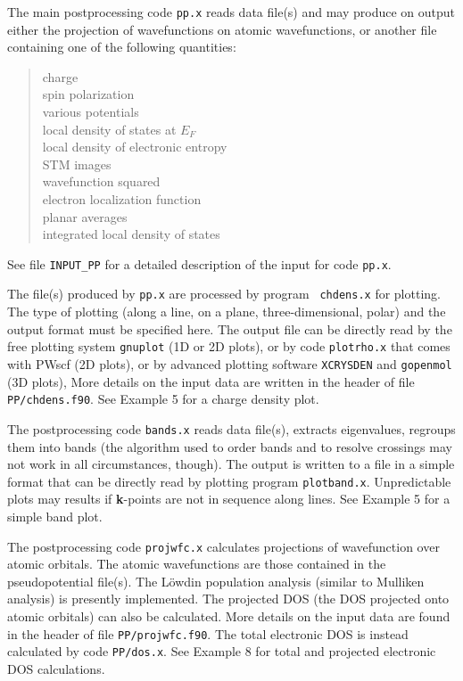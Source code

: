 \documentclass[12pt]{article}
\begin{document}
The main postprocessing code {\tt pp.x} reads data file(s) and may
produce on output either the projection of wavefunctions on atomic
wavefunctions, or another file containing one of the following
quantities:
\begin{quote}
charge\\
spin polarization\\
various potentials\\
local density of states at $E_F$\\
local density of electronic entropy\\
STM images\\
wavefunction squared\\
electron localization function\\
planar averages\\
integrated local density of states
\end{quote}
See file {\tt INPUT\_PP} for a detailed description of the input for
code {\tt pp.x}.

The file(s) produced by {\tt pp.x} are processed by program {\tt
chdens.x} for plotting. The type of plotting (along a line, on a plane,
three-dimensional, polar) and the output format must be specified
here. The output file can be directly read by the free plotting system
{\tt gnuplot} (1D or 2D plots), or by code {\tt plotrho.x} that comes
with PWscf (2D plots), or by advanced plotting software {\tt XCRYSDEN}
and {\tt gopenmol} (3D plots), More details on the input data are
written in the header of file {\tt PP/chdens.f90}. See Example 5 
for a charge density plot.

The postprocessing code {\tt bands.x} reads data file(s), extracts
eigenvalues, regroups them into bands (the algorithm used to order bands
and to resolve crossings may not work in all circumstances, though). The
output is written to a file in a simple format that can be directly read
by plotting program {\tt plotband.x}.  Unpredictable plots may results
if {\bf k}-points are not in sequence along lines. See Example 5 
for a simple band plot.

The postprocessing code {\tt projwfc.x} calculates projections of 
wavefunction over atomic orbitals. The atomic wavefunctions are
those contained in the pseudopotential file(s). The L\"owdin 
population analysis (similar to Mulliken analysis) is presently 
implemented. The projected DOS (the DOS projected onto atomic 
orbitals) can also be calculated. More details on the input data 
are found in the header of file {\tt PP/projwfc.f90}. The total 
electronic DOS is instead calculated by code {\tt PP/dos.x}.
See Example 8 for total and projected electronic DOS calculations.
\end{document}
